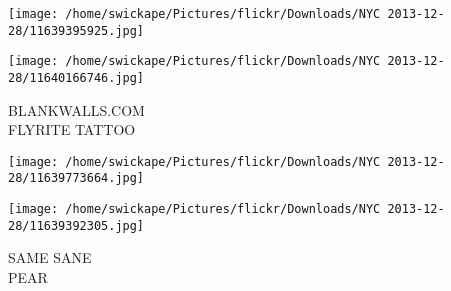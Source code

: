 \documentclass[10pt,letterpaper]{article}
\begin{document}
\texttt{[image: /home/swickape/Pictures/flickr/Downloads/NYC 2013-12-28/11639395925.jpg]}

\vspace{0.25in}
\texttt{[image: /home/swickape/Pictures/flickr/Downloads/NYC 2013-12-28/11640166746.jpg]}

BLANKWALLS.COM\\
FLYRITE TATTOO
\pagebreak

\texttt{[image: /home/swickape/Pictures/flickr/Downloads/NYC 2013-12-28/11639773664.jpg]}

\vspace{0.25in}
\texttt{[image: /home/swickape/Pictures/flickr/Downloads/NYC 2013-12-28/11639392305.jpg]}

SAME SANE\\
PEAR
\pagebreak
\end{document}
